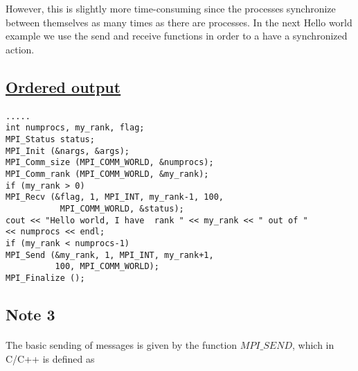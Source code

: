 \documentclass[%
oneside,                 %
final,                   %
10pt]{article}
\begin{document}
\noindent
However, this is slightly more time-consuming since the processes synchronize between themselves as many times as there
are processes.  In the next Hello world example we use the send and receive functions in order to a have a synchronized
action.



\subsection*{\href{{https://github.com/CompPhysics/ComputationalPhysics2/blob/gh-pages/doc/Programs/LecturePrograms/programs/MPI/chapter07/program4.cpp}}{Ordered output}}

\paragraph{}

















\begin{Verbatim}[numbers=none,fontsize=\fontsize{9pt}{9pt},baselinestretch=0.95]
.....
int numprocs, my_rank, flag;
MPI_Status status;
MPI_Init (&nargs, &args);
MPI_Comm_size (MPI_COMM_WORLD, &numprocs);
MPI_Comm_rank (MPI_COMM_WORLD, &my_rank);
if (my_rank > 0)
MPI_Recv (&flag, 1, MPI_INT, my_rank-1, 100, 
           MPI_COMM_WORLD, &status);
cout << "Hello world, I have  rank " << my_rank << " out of " 
<< numprocs << endl;
if (my_rank < numprocs-1)
MPI_Send (&my_rank, 1, MPI_INT, my_rank+1, 
          100, MPI_COMM_WORLD);
MPI_Finalize ();

\end{Verbatim}



\subsection*{Note 3}

\paragraph{}

The basic sending of messages is given by the function $MPI\_SEND$, which in C/C++
is defined as 
\end{document}
